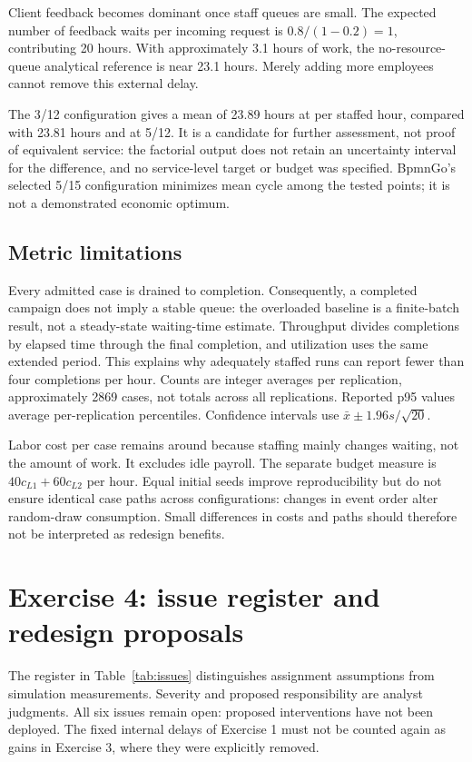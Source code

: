 \documentclass[10pt,a4paper]{article}
\newcommand{\EUR}{\texteuro}
\begin{document}
Client feedback becomes dominant once staff queues are small. The expected number
of feedback waits per incoming request is $0.8/(1-0.2)=1$, contributing 20 hours.
With approximately 3.1 hours of work, the no-resource-queue analytical reference
is near 23.1 hours. Merely adding more employees cannot remove this external delay.

The 3/12 configuration gives a mean of 23.89 hours at \EUR840 per staffed hour,
compared with 23.81 hours and \EUR920 at 5/12. It is a candidate for further
assessment, not proof of equivalent service: the factorial output does not retain
an uncertainty interval for the difference, and no service-level target or budget
was specified. BpmnGo's selected 5/15 configuration minimizes mean cycle among the
tested points; it is not a demonstrated economic optimum.

\subsection{Metric limitations}
Every admitted case is drained to completion. Consequently, a completed campaign
does not imply a stable queue: the overloaded baseline is a finite-batch result,
not a steady-state waiting-time estimate. Throughput divides completions by elapsed
time through the final completion, and utilization uses the same extended period.
This explains why adequately staffed runs can report fewer than four completions
per hour. Counts are integer averages per replication, approximately 2869 cases,
not totals across all replications. Reported p95 values average per-replication
percentiles. Confidence intervals use $\bar{x}\pm1.96s/\sqrt{20}$.

Labor cost per case remains around \EUR177 because staffing mainly changes waiting,
not the amount of work. It excludes idle payroll. The separate budget measure is
$40c_{L1}+60c_{L2}$ per hour. Equal initial seeds improve reproducibility but do not
ensure identical case paths across configurations: changes in event order alter
random-draw consumption. Small differences in costs and paths should therefore
not be interpreted as redesign benefits.

\section{Exercise 4: issue register and redesign proposals}
The register in Table~\ref{tab:issues} distinguishes assignment assumptions from
simulation measurements. Severity and proposed responsibility are analyst judgments.
All six issues remain open: proposed interventions have not been deployed.
The fixed internal delays of Exercise 1 must not be counted again as gains in
Exercise 3, where they were explicitly removed.
\end{document}
